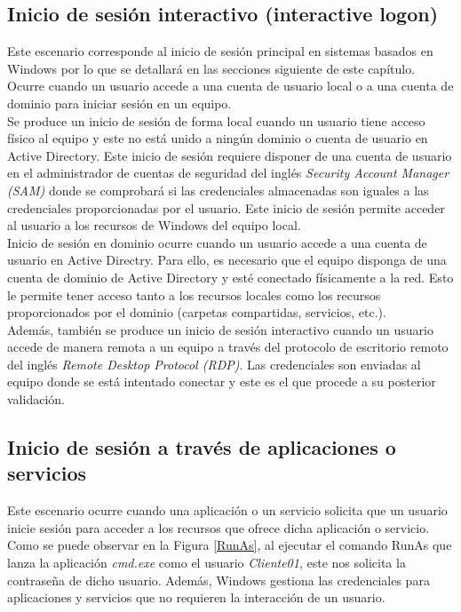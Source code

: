 \subsection{Inicio de sesión interactivo (interactive logon)}

Este escenario corresponde al inicio de sesión principal en sistemas basados en Windows por lo que se detallará en las secciones siguiente de este capítulo. Ocurre cuando un usuario accede a una cuenta de usuario local o a una cuenta de dominio para iniciar sesión en un equipo. \\

Se produce un inicio de sesión de forma local cuando un usuario tiene acceso físico al equipo y este no está unido a ningún dominio o cuenta de usuario en Active Directory. Este inicio de sesión requiere disponer de una cuenta de usuario en el administrador de cuentas de seguridad del inglés {\it Security Account Manager (SAM)} donde se comprobará si las credenciales almacenadas son iguales a las credenciales proporcionadas por el usuario. Este inicio de sesión permite acceder al usuario a los recursos de Windows del equipo local. \\

Inicio de sesión en dominio ocurre cuando un usuario accede a una cuenta de usuario en Active Directry. Para ello, es necesario que el equipo disponga de una cuenta de dominio de Active Directory y esté conectado físicamente a la red. Esto le permite tener acceso tanto a los recursos locales como los recursos proporcionados por el dominio (carpetas compartidas, servicios, etc.). \\

Además, también se produce  un inicio de sesión interactivo cuando un usuario accede de manera remota a un equipo a través del protocolo de escritorio remoto del inglés {\it Remote Desktop Protocol (RDP)}. Las credenciales son enviadas al equipo donde se está intentado conectar y este es el que procede a su posterior validación. 

\subsection{Inicio de sesión a través de aplicaciones o servicios}

Este escenario ocurre cuando una aplicación o un servicio solicita que un usuario inicie sesión para acceder a los recursos que ofrece dicha aplicación o servicio. Como se puede observar en la Figura \ref{RunAs}, al ejecutar el comando RunAs que lanza la aplicación {\it cmd.exe} como el usuario {\it Cliente01}, este nos solicita la contraseña de dicho usuario. Además, Windows gestiona las credenciales para aplicaciones y servicios que no requieren la interacción de un usuario. \\

